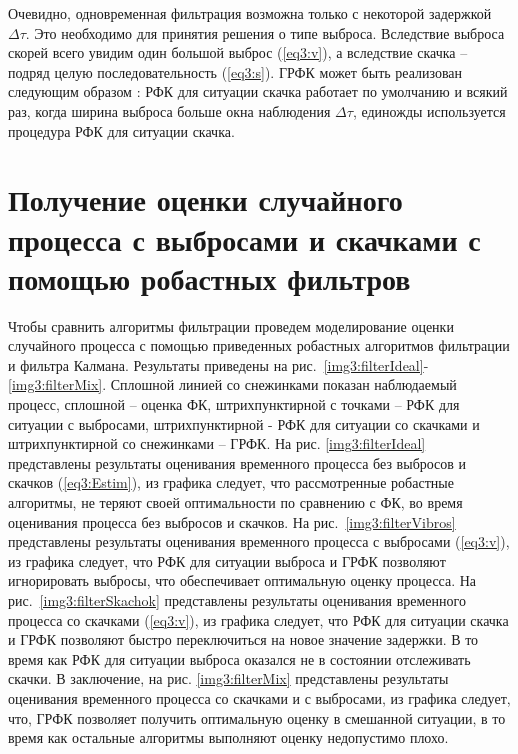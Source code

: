 Очевидно, одновременная фильтрация возможна только с некоторой задержкой $\Delta \tau$. Это необходимо для принятия решения о типе выброса. Вследствие выброса скорей всего увидим один большой выброс (\ref{eq3:v}), а вследствие скачка – подряд целую последовательность (\ref{eq3:s}). ГРФК может быть реализован следующим образом \cite{RobustFilter}: РФК для ситуации скачка работает по умолчанию и всякий раз, когда ширина выброса больше окна наблюдения $\Delta \tau$, единожды используется процедура РФК для ситуации скачка.


\section{Получение оценки случайного процесса с выбросами и скачками с помощью робастных фильтров} \label{sect3_6}
Чтобы сравнить алгоритмы фильтрации проведем моделирование оценки случайного процесса с помощью приведенных робастных алгоритмов фильтрации и фильтра Калмана. Результаты приведены на рис. \ref{img3:filterIdeal}-\ref{img3:filterMix}. Сплошной линией со снежинками показан наблюдаемый процесс, сплошной – оценка ФК, штрихпунктирной с точками – РФК для ситуации с выбросами, штрихпунктирной - РФК для ситуации со скачками и штрихпунктирной со снежинками – ГРФК. На рис. \ref{img3:filterIdeal} представлены результаты оценивания временного процесса без выбросов и скачков (\ref{eq3:Estim}), из графика следует, что рассмотренные робастные алгоритмы, не теряют своей оптимальности по сравнению с ФК, во время оценивания процесса без выбросов и скачков.
На рис. \ref{img3:filterVibros} представлены результаты оценивания временного процесса с выбросами (\ref{eq3:v}), из графика следует, что РФК для ситуации выброса и ГРФК позволяют игнорировать выбросы, что обеспечивает оптимальную оценку процесса.
На рис. \ref{img3:filterSkachok} представлены результаты оценивания временного процесса со скачками (\ref{eq3:v}), из графика следует, что РФК для ситуации скачка и ГРФК позволяют быстро переключиться на новое значение задержки. В то время как РФК для ситуации выброса оказался не в состоянии отслеживать скачки.
В заключение, на рис. \ref{img3:filterMix} представлены результаты оценивания временного процесса со скачками и с выбросами, из графика следует, что, ГРФК позволяет получить оптимальную оценку в смешанной ситуации, в то время как остальные алгоритмы выполняют оценку недопустимо плохо.


